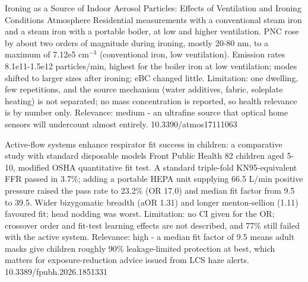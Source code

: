 \documentclass[10pt]{article}
\begin{document}
\par{}\baselineskip{}\baselineskip
{}

{Ironing as a Source of Indoor Aerosol Particles: Effects of Ventilation and Ironing Conditions}
{Atmosphere}
{Residential measurements with a conventional steam iron and a steam iron with a portable boiler, at low and higher ventilation. PNC rose by about two orders of magnitude during ironing, mostly 20-80 nm, to a maximum of 7.12e5 cm$^{-3}$ (conventional iron, low ventilation). Emission rates 8.1e11-1.5e12 particles/min, highest for the boiler iron at low ventilation; modes shifted to larger sizes after ironing; eBC changed little. Limitation: one dwelling, few repetitions, and the source mechanism (water additives, fabric, soleplate heating) is not separated; no mass concentration is reported, so health relevance is by number only. Relevance: medium - an ultrafine source that optical home sensors will undercount almost entirely.}
{10.3390/atmos17111063}

\par{}\baselineskip{}\baselineskip
{}

{Active-flow systems enhance respirator fit success in children: a comparative study with standard disposable models}
{Front Public Health}
{82 children aged 5-10, modified OSHA quantitative fit test. A standard triple-fold KN95-equivalent FFR passed in 3.7\%; adding a portable HEPA unit supplying 66.5 L/min positive pressure raised the pass rate to 23.2\% (OR 17.0) and median fit factor from 9.5 to 39.5. Wider bizygomatic breadth (aOR 1.31) and longer menton-sellion (1.11) favoured fit; head nodding was worst. Limitation: no CI given for the OR; crossover order and fit-test learning effects are not described, and 77\% still failed with the active system. Relevance: high - a median fit factor of 9.5 means adult masks give children roughly 90\% leakage-limited protection at best, which matters for exposure-reduction advice issued from LCS haze alerts.}
{10.3389/fpubh.2026.1851331}
\end{document}
